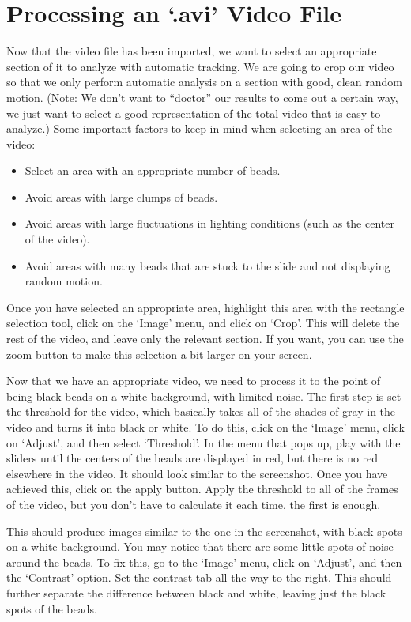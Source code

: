 \section*{Processing an `.avi' Video File}
Now that the video file has been imported, we want to select an appropriate section of it to analyze with automatic tracking. 
We are going to crop our video so that we only perform automatic analysis on a section with good, clean random motion. 
(Note: We don’t want to ``doctor'' our results to come out a certain way, we just want to select a good representation of the total video that is easy to analyze.) 
Some important factors to keep in mind when selecting an area of the video:
\begin{itemize}
\item Select an area with an appropriate number of beads.
\item Avoid areas with large clumps of beads.
\item Avoid areas with large fluctuations in lighting conditions (such as the center of the video).
\item Avoid areas with many beads that are stuck to the slide and not displaying random motion.
\end{itemize}
Once you have selected an appropriate area, highlight this area with the rectangle selection tool, click on the `Image' menu, and click on `Crop'. 
This will delete the rest of the video, and leave only the relevant section. 
If you want, you can use the zoom button to make this selection a bit larger on your screen.
\par 
Now that we have an appropriate video, we need to process it to the point of being black beads on a white background, with limited noise. 
The first step is set the threshold for the video, which basically takes all of the shades of gray in the video and turns it into black or white. 
To do this, click on the `Image' menu, click on `Adjust', and then select `Threshold'. 
In the menu that pops up, play with the sliders until the centers of the beads are displayed in red, but there is no red elsewhere in the video. 
It should look similar to the screenshot. 
Once you have achieved this, click on the apply button. 
Apply the threshold to all of the frames of the video, but you don't have to calculate it each time, the first is enough.
\par 
This should produce images similar to the one in the screenshot, with black spots on a white background. 
You may notice that there are some little spots of noise around the beads. 
To fix this, go to the `Image' menu, click on `Adjust', and then the `Contrast' option. 
Set the contrast tab all the way to the right. 
This should further separate the difference between black and white, leaving just the black spots of the beads.
